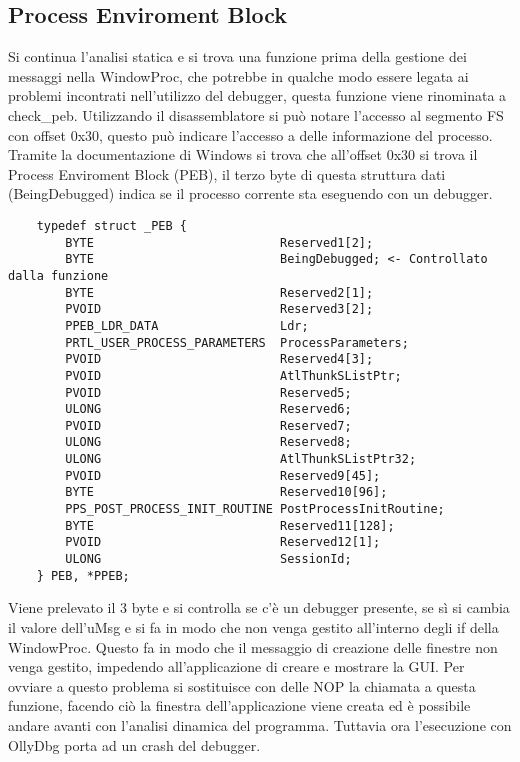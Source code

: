 \documentclass[a4paper,12pt]{article}
\begin{document}
\subsection{Process Enviroment Block}
Si continua l'analisi statica e si trova una funzione prima della gestione dei messaggi nella WindowProc, che potrebbe in qualche modo essere legata ai problemi incontrati nell'utilizzo del debugger, questa funzione viene rinominata a check\_peb. Utilizzando il disassemblatore si può notare l'accesso al segmento FS con offset 0x30, questo può indicare l'accesso a delle informazione del processo. Tramite la documentazione di Windows si trova che all'offset 0x30 si trova il Process Enviroment Block (PEB), il terzo byte di questa struttura dati (BeingDebugged) indica se il processo corrente sta eseguendo con un debugger.

\begin{verbatim}
	typedef struct _PEB {
		BYTE                          Reserved1[2];
		BYTE                          BeingDebugged; <- Controllato dalla funzione
		BYTE                          Reserved2[1];
		PVOID                         Reserved3[2];
		PPEB_LDR_DATA                 Ldr;
		PRTL_USER_PROCESS_PARAMETERS  ProcessParameters;
		PVOID                         Reserved4[3];
		PVOID                         AtlThunkSListPtr;
		PVOID                         Reserved5;
		ULONG                         Reserved6;
		PVOID                         Reserved7;
		ULONG                         Reserved8;
		ULONG                         AtlThunkSListPtr32;
		PVOID                         Reserved9[45];
		BYTE                          Reserved10[96];
		PPS_POST_PROCESS_INIT_ROUTINE PostProcessInitRoutine;
		BYTE                          Reserved11[128];
		PVOID                         Reserved12[1];
		ULONG                         SessionId;
	} PEB, *PPEB;
\end{verbatim}

 Viene prelevato il 3 byte e si controlla se c'è un debugger presente, se sì si cambia il valore dell'uMsg e si fa in modo che non venga gestito all'interno degli if della WindowProc. Questo fa in modo che il messaggio di creazione delle finestre non venga gestito, impedendo all'applicazione di creare e mostrare la GUI. Per ovviare a questo problema si sostituisce con delle NOP la chiamata a questa funzione, facendo ciò la finestra dell'applicazione viene creata ed è possibile andare avanti con l'analisi dinamica del programma. Tuttavia ora l'esecuzione con OllyDbg porta ad un crash del debugger.
\end{document}
